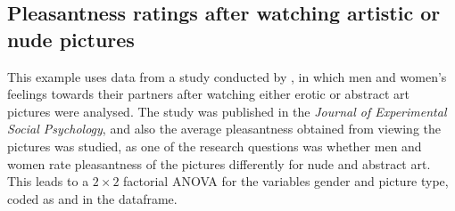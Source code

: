 \subsection{Pleasantness ratings after watching artistic or nude pictures}
This example uses data from a study conducted by \cite{Balzarini2017}, in which men and women's feelings towards their partners after watching either erotic or abstract art pictures were analysed. The study was published in the \textit{Journal of Experimental Social Psychology}, and also the average pleasantness obtained from viewing the pictures was studied, as one of the research questions was whether men and women rate pleasantness of the pictures differently for nude and abstract art. This leads to a $2\times 2$ factorial ANOVA for the variables gender and picture type, coded as  and  in the dataframe.


